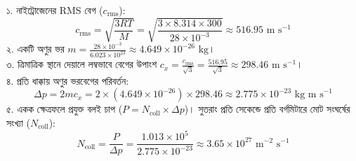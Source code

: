 \documentclass[12pt, a4paper]{article}
\begin{document}
\begin{tcolorbox}[solutionbox={সমাধান (Solution)}]
\noindent
১. নাইট্রোজেনের RMS বেগ ($c_{\text{rms}}$):
\[ c_{\text{rms}} = \sqrt{\frac{3 R T}{M}} = \sqrt{\frac{3 \times 8.314 \times 300}{28 \times 10^{-3}}} \approx 516.95\text{ m s}^{-1} \]
২. একটি অণুর ভর $m = \frac{28 \times 10^{-3}}{6.023 \times 10^{23}} \approx 4.649 \times 10^{-26}\text{ kg}$। \\
৩. ত্রিমাত্রিক স্থানে দেয়ালে লম্বভাবে বেগের উপাংশ $c_x = \frac{c_{\text{rms}}}{\sqrt{3}} = \frac{516.95}{\sqrt{3}} \approx 298.46\text{ m s}^{-1}$। \\
৪. প্রতি ধাক্কায় অণুর ভরবেগের পরিবর্তন:
\[ \Delta p = 2 m c_x = 2 \times (4.649 \times 10^{-26}) \times 298.46 \approx 2.775 \times 10^{-23}\text{ kg m s}^{-1} \]
৫. একক ক্ষেত্রফলে প্রযুক্ত বলই চাপ ($P = N_{\text{coll}} \times \Delta p$)। সুতরাং প্রতি সেকেন্ডে প্রতি বর্গমিটারে মোট সংঘর্ষের সংখ্যা ($N_{\text{coll}}$):
\[ N_{\text{coll}} = \frac{P}{\Delta p} = \frac{1.013 \times 10^5}{2.775 \times 10^{-23}} \approx 3.65 \times 10^{27}\text{ m}^{-2}\text{ s}^{-1} \]
\end{tcolorbox}
\end{document}
